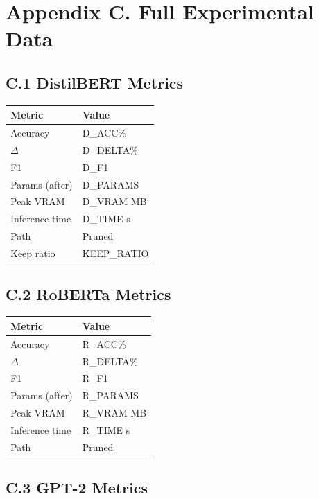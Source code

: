 
\section{Appendix C. Full Experimental Data}

\subsection{C.1 DistilBERT Metrics}

\begin{table}[H]
\centering
\small
\begin{tabular}{ll}
\toprule
\textbf{Metric} & \textbf{Value} \\
\midrule
Accuracy & {{D\_ACC}}\% \\
$\Delta$ & {{D\_DELTA}}\% \\
F1 & {{D\_F1}} \\
Params (after) & {{D\_PARAMS}} \\
Peak VRAM & {{D\_VRAM}} MB \\
Inference time & {{D\_TIME}} s \\
Path & Pruned \\
Keep ratio & {{KEEP\_RATIO}} \\
\bottomrule
\end{tabular}
\end{table}

\subsection{C.2 RoBERTa Metrics}

\begin{table}[H]
\centering
\small
\begin{tabular}{ll}
\toprule
\textbf{Metric} & \textbf{Value} \\
\midrule
Accuracy & {{R\_ACC}}\% \\
$\Delta$ & {{R\_DELTA}}\% \\
F1 & {{R\_F1}} \\
Params (after) & {{R\_PARAMS}} \\
Peak VRAM & {{R\_VRAM}} MB \\
Inference time & {{R\_TIME}} s \\
Path & Pruned \\
\bottomrule
\end{tabular}
\end{table}

\subsection{C.3 GPT-2 Metrics}

